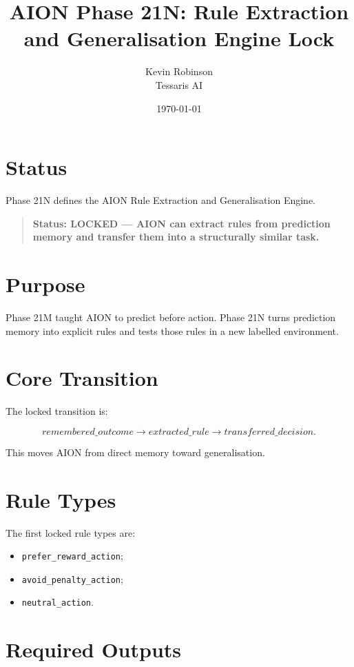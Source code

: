 \documentclass[11pt,a4paper]{article}
\title{\textbf{AION Phase 21N: Rule Extraction and Generalisation Engine Lock}}
\author{Kevin Robinson\\Tessaris AI}
\date{\today}
\begin{document}
\maketitle

\section{Status}

Phase 21N defines the AION Rule Extraction and Generalisation Engine.

\begin{quote}
\textbf{Status: LOCKED --- AION can extract rules from prediction memory and transfer them into a structurally similar task.}
\end{quote}

\section{Purpose}

Phase 21M taught AION to predict before action. Phase 21N turns prediction memory into explicit rules and tests those rules in a new labelled environment.

\section{Core Transition}

The locked transition is:

\[
remembered\_outcome \rightarrow extracted\_rule \rightarrow transferred\_decision.
\]

This moves AION from direct memory toward generalisation.

\section{Rule Types}

The first locked rule types are:

\begin{itemize}
  \item \texttt{prefer\_reward\_action};
  \item \texttt{avoid\_penalty\_action};
  \item \texttt{neutral\_action}.
\end{itemize}

\section{Required Outputs}
\end{document}
